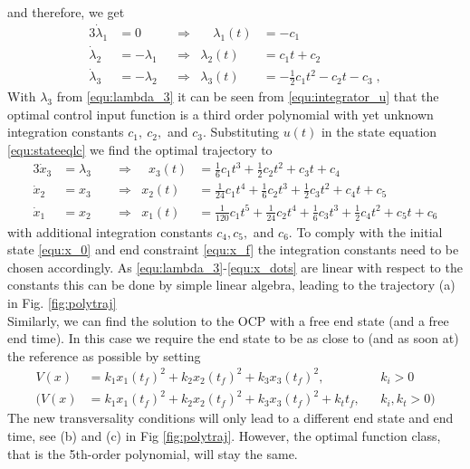 and therefore, we get
\begin{alignat}{3}
\nonumber
	\dot \lambda_1 &= 0 \quad  & &\Rightarrow &\quad \lambda_1(t) &= -c_1 \\
\nonumber
	\dot \lambda_2 &= -\lambda_1 & &\Rightarrow  & \lambda_2(t) &= c_1 t + c_2 \\
\label{equ:lambda_3}
	\dot \lambda_3 &= -\lambda_2 & &\Rightarrow  & \lambda_3(t) &= -\frac{1}{2}c_1 t^2 - c_2 t - c_3 \; , 
\end{alignat}
With $\lambda_3$ from \eqref{equ:lambda_3} it can be seen from \eqref{equ:integrator_u} that the optimal control input function is a third order polynomial with yet unknown integration constants $c_1, \ c_2,$ and $c_3$. Substituting $u(t)$ in the state equation \eqref{equ:stateeqlc} we find the optimal trajectory to 
\begin{alignat}{3}
	\dot x_3 &= \lambda_3 \;\;  & &\Rightarrow &\;\; x_3(t) &= \frac{1}{6}c_1 t^3  + \frac{1}{2}c_2 t^2 + c_3 t + c_4 \\
	\dot x_2 &= x_3 & &\Rightarrow  & x_2(t) &=\frac{1}{24} c_1 t^4 + \frac{1}{6}c_2 t^3 + \frac{1}{2} c_3 t^2 + c_4 t + c_5 \\
	\dot x_1 &= x_2 & &\Rightarrow  & x_1(t) &=\frac{1}{120} c_1 t^5 + \frac{1}{24} c_2 t^4 + \frac{1}{6}c_3 t^3 +\frac{1}{2}c_4 t^2 + c_5 t + c_6
	\label{equ:x_dots}
\end{alignat}
with additional integration constants $c_4,c_5,$ and $c_6$. To comply with the initial state \eqref{equ:x_0} and end constraint \eqref{equ:x_f} the integration constants need to be chosen accordingly. As \eqref{equ:lambda_3}-\eqref{equ:x_dots} are linear with respect to the constants this can be done by simple linear algebra, leading to the trajectory (a) in Fig. \ref{fig:polytraj} 
\\
Similarly, we can find the solution to the OCP with a free end state (and a free end time). In this case we require the end state to be as close to (and as soon at) the reference as possible by setting
\begin{align*}
V(x) &=k_1 x_1 (t_f)^2+k_2 x_2(t_f)^2 + k_3 x_3(t_f)^2 ,&& k_i>0\\
(V(x) &=k_1 x_1 (t_f)^2+k_2 x_2(t_f)^2 + k_3 x_3(t_f)^2 + k_t t_f,&& k_i,k_t>0 )
\end{align*}
The new transversality conditions will only lead to a different end state and end time, see (b) and (c) in Fig \ref{fig:polytraj}. However, the optimal function class, that is the 5th-order polynomial, will stay the same.

